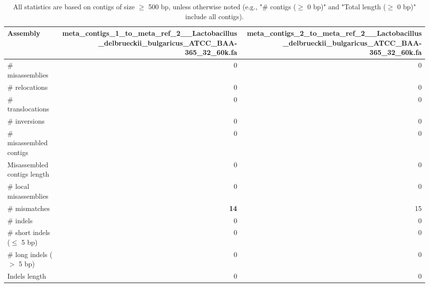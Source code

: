 \documentclass[12pt,a4paper]{article}
\begin{document}
\begin{table}[ht]
\begin{center}
\caption{All statistics are based on contigs of size $\geq$ 500 bp, unless otherwise noted (e.g., "\# contigs ($\geq$ 0 bp)" and "Total length ($\geq$ 0 bp)" include all contigs).}
\begin{tabular}{|l*{2}{|r}|}
\hline
Assembly & meta\_contigs\_1\_to\_meta\_ref\_2\_\_Lactobacillus\_delbrueckii\_bulgaricus\_ATCC\_BAA-365\_32\_60k.fa & meta\_contigs\_2\_to\_meta\_ref\_2\_\_Lactobacillus\_delbrueckii\_bulgaricus\_ATCC\_BAA-365\_32\_60k.fa \\ \hline
\# misassemblies & 0 & 0 \\ \hline
\hspace{5mm}\# relocations & 0 & 0 \\ \hline
\hspace{5mm}\# translocations & 0 & 0 \\ \hline
\hspace{5mm}\# inversions & 0 & 0 \\ \hline
\# misassembled contigs & 0 & 0 \\ \hline
Misassembled contigs length & 0 & 0 \\ \hline
\# local misassemblies & 0 & 0 \\ \hline
\# mismatches & {\bf 14} & 15 \\ \hline
\# indels & 0 & 0 \\ \hline
\hspace{5mm}\# short indels ($\leq$ 5 bp) & 0 & 0 \\ \hline
\hspace{5mm}\# long indels ($>$ 5 bp) & 0 & 0 \\ \hline
Indels length & 0 & 0 \\ \hline
\end{tabular}
\end{center}
\end{table}
\end{document}
